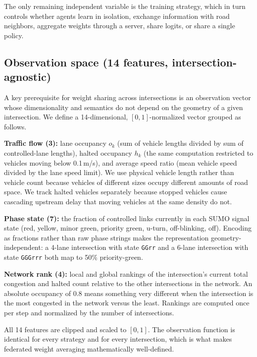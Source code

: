 \documentclass[conference]{IEEEtran}
\begin{document}
The only remaining independent variable is the training strategy, which in turn controls whether agents learn in isolation, exchange information with road neighbors, aggregate weights through a server, share logits, or share a single policy.

\subsection{Observation space (14 features, intersection-agnostic)}\label{sec:framework-obs}
A key prerequisite for weight sharing across intersections is an observation vector whose dimensionality and semantics do not depend on the geometry of a given intersection. We define a 14-dimensional, $[0,1]$-normalized vector grouped as follows.

\textbf{Traffic flow (3):} lane occupancy $o_k$ (sum of vehicle lengths divided by sum of controlled-lane lengths), halted occupancy $h_k$ (the same computation restricted to vehicles moving below 0.1\,m/s), and average speed ratio (mean vehicle speed divided by the lane speed limit). We use physical vehicle length rather than vehicle count because vehicles of different sizes occupy different amounts of road space. We track halted vehicles separately because stopped vehicles cause cascading upstream delay that moving vehicles at the same density do not.

\textbf{Phase state (7):} the fraction of controlled links currently in each SUMO signal state (red, yellow, minor green, priority green, u-turn, off-blinking, off). Encoding as fractions rather than raw phase strings makes the representation geometry-independent: a 4-lane intersection with state \texttt{GGrr} and a 6-lane intersection with state \texttt{GGGrrr} both map to 50\% priority-green.

\textbf{Network rank (4):} local and global rankings of the intersection's current total congestion and halted count relative to the other intersections in the network. An absolute occupancy of 0.8 means something very different when the intersection is the most congested in the network versus the least. Rankings are computed once per step and normalized by the number of intersections.

All 14 features are clipped and scaled to $[0,1]$. The observation function is identical for every strategy and for every intersection, which is what makes federated weight averaging mathematically well-defined.
\end{document}
